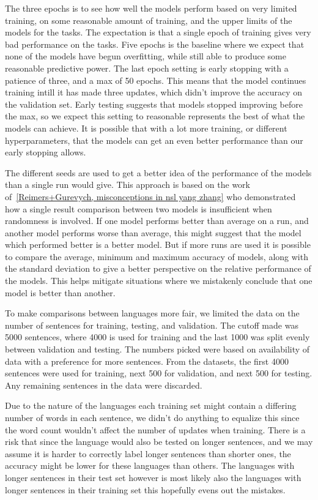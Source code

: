 The three epochs is to see how well the models perform based on very limited
training, on some reasonable amount of training, and the upper limits of the
models for the tasks. The expectation is that a single epoch of training gives
very bad performance on the tasks. Five epochs is the baseline where we expect
that none of the models have begun overfitting, while still able to produce some
reasonable predictive power. The last epoch setting is early stopping with a
patience of three, and a max of 50 epochs. This means that the model continues
training intill it has made three updates, which didn't improve the accuracy on
the validation set. Early testing suggests that models stopped improving before
the max, so we expect this setting to reasonable represents the best of what the
models can achieve. It is possible that with a lot more training, or different
hyperparameters, that the models can get an even better performance than our
early stopping allows.

The different seeds are used to get a better idea of the performance of the
models than a single run would give. This approach is based on the work
of~\ref{Reimers+Gurevych, misconceptions in nsl yang zhang} who demonstrated how
a single result comparison between two models is insufficient when randomness is
involved. If one model performs better than average on a run, and another model
performs worse than average, this might suggest that the model which performed
better is a better model. But if more runs are used it is possible to compare
the average, minimum and maximum accuracy of models, along with the standard
deviation to give a better perspective on the relative performance of the
models. This helps mitigate situations where we mistakenly conclude that one
model is better than another.

To make comparisons between languages more fair, we limited the data on the
number of sentences for training, testing, and validation. The cutoff made was
5000 sentences, where 4000 is used for training and the last 1000 was split
evenly between validation and testing. The numbers picked were based on
availability of data with a preference for more sentences. From the datasets,
the first 4000 sentences were used for training, next 500 for validation, and
next 500 for testing. Any remaining sentences in the data were discarded.

Due to the nature of the languages each training set might contain a differing
number of words in each sentence, we didn't do anything to equalize this since
the word count wouldn't affect the number of updates when training. There is a
risk that since the language would also be tested on longer sentences, and we
may assume it is harder to correctly label longer sentences than shorter ones,
the accuracy might be lower for these languages than others. The languages with
longer sentences in their test set however is most likely also the languages
with longer sentences in their training set this hopefully evens out the
mistakes.

